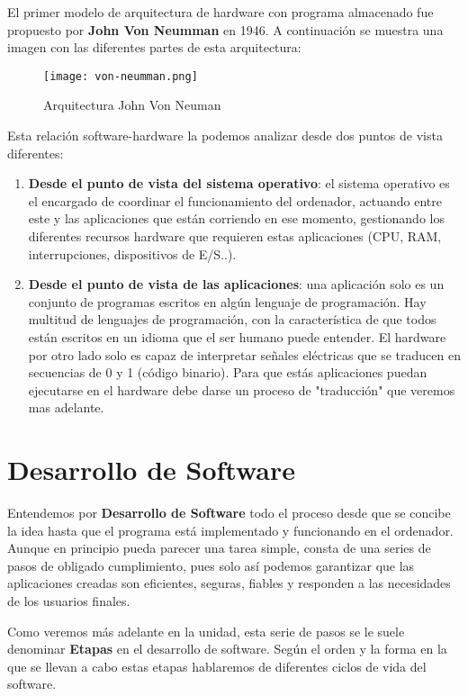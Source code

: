 El primer modelo de arquitectura de hardware con programa almacenado fue propuesto por {\bfseries John Von Neumman} en 1946. A continuación se muestra una imagen con las diferentes partes de esta arquitectura:

\begin{figure}[h]
    \centering
    \texttt{[image: von-neumman.png]}
    \caption{Arquitectura John Von Neuman}
\end{figure}

Esta relación software-hardware la podemos analizar desde dos puntos de vista diferentes:

\begin{enumerate}[label={\alph*}]
    \item {\bfseries Desde el punto de vista del sistema operativo}: el sistema operativo es el encargado de coordinar
    el funcionamiento del ordenador, actuando entre este y las aplicaciones que están corriendo en ese momento, gestionando los diferentes recursos hardware que requieren estas aplicaciones (CPU, RAM, interrupciones, dispositivos de E/S..).
    \item {\bfseries Desde el punto de vista de las aplicaciones}: una aplicación solo es un conjunto de programas  escritos en algún lenguaje de programación. Hay multitud de lenguajes de programación, con la característica de que todos están escritos en un idioma que el ser humano puede entender. El hardware por otro lado solo es capaz de interpretar señales eléctricas que se traducen en secuencias de 0 y 1 (código binario). Para que estás aplicaciones puedan ejecutarse en el hardware debe darse un proceso de "traducción" que veremos mas adelante.
\end{enumerate}

\section{Desarrollo de Software}
Entendemos por {\bfseries \gls{Desarrollo de Software}} todo el proceso desde que se concibe la idea hasta que el programa está implementado y funcionando en el ordenador. Aunque en principio pueda parecer una tarea simple, consta de una series de pasos de obligado cumplimiento, pues solo así podemos garantizar que las aplicaciones creadas son eficientes, seguras, fiables y responden a las necesidades de los usuarios finales.

Como veremos más adelante en la unidad, esta serie de pasos se le suele denominar {\bfseries Etapas} en el desarrollo de software. Según el orden y la forma en la que se llevan a cabo estas etapas hablaremos de diferentes ciclos de vida del software. \\

